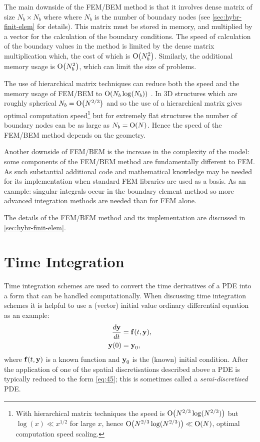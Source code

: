The main downside of the FEM/BEM method is that it involves dense matrix of size $N_b \times N_b$ where where $N_b$ is the number of boundary nodes (see \cref{sec:hybr-finit-elem} for details).
This matrix must be stored in memory, and multiplied by a vector for the calculation of the boundary conditions.
The speed of calculation of the boundary values in the method is limited by the dense matrix multiplication which, the cost of which is $\mathrm{O}{\left( N_b^2 \right)}$.
Similarly, the additional memory usage is $\mathrm{O}{\left( N_b^2 \right)}$, which can limit the size of problems.

The use of hierarchical matrix techniques can reduce both the speed and the memory usage of FEM/BEM to $\mathrm{O}{\left( N_b \log(N_b) \right)}$ \cite{Knittel2009}.
In 3D structures which are roughly spherical $N_b = \mathrm{O}{\left( N^{2/3} \right)}$ and so the use of a hierarchical matrix gives optimal computation speed\footnote{With hierarchical matrix techniques the speed is $\mathrm{O}{\left( N^{2/3}\log(N^{2/3}) \right)}$ but $\log(x) \ll x^{1/2}$ for large $x$, hence $\mathrm{O}{\left( N^{2/3}\log(N^{2/3}) \right)} \ll \mathrm{O}{\left( N \right)}$, \ie optimal computation speed scaling.} but for extremely flat structures the number of boundary nodes can be as large as $N_b = \mathrm{O}{\left( N \right)}$.
Hence the speed of the FEM/BEM method depends on the geometry.

Another downside of FEM/BEM is the increase in the complexity of the model: some components of the FEM/BEM method are fundamentally different to FEM.
As such substantial additional code and mathematical knowledge may be needed for its implementation when standard FEM libraries are used as a basis.
As an example: singular integrals occur in the boundary element method so more advanced integration methods are needed than for FEM alone.

The details of the FEM/BEM method and its implementation are discussed in \cref{sec:hybr-finit-elem}.


\section{Time Integration}
\label{sec:time-discretisation}

Time integration schemes are used to convert the time derivatives of a PDE into a form that can be handled computationally.
When discussing time integration schemes it is helpful to use a (vector) initial value ordinary differential equation as an example:
\begin{equation}
  \begin{aligned}
    \frac{d \boldsymbol{\mathrm{y}}}{dt} &= {\boldsymbol{\mathrm{f}}{\left( t, \boldsymbol{\mathrm{y}} \right)}}, \\
    \boldsymbol{\mathrm{y}}(0) &= \boldsymbol{\mathrm{y}}_0,
    \label{eq:45}
  \end{aligned}
\end{equation}
where ${\boldsymbol{\mathrm{f}}}(t,\boldsymbol{\mathrm{y}})$ is a known function and $\boldsymbol{\mathrm{y}}_0$ is the (known) initial condition.
After the application of one of the spatial discretisations described above a PDE is typically reduced to the form \cref{eq:45}; this is sometimes called a \emph{semi-discretised} PDE.

